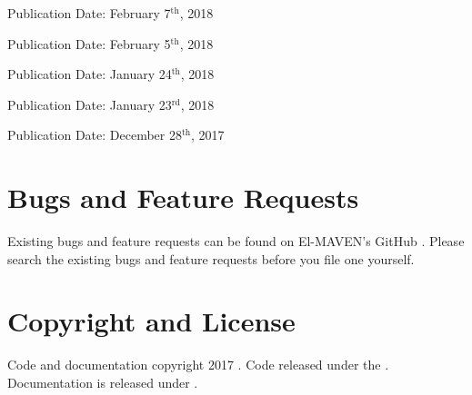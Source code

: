 \documentclass[letterpaper,10pt,english,openany,oneside]{sphinxmanual}
\begin{document}

Publication Date: February 7$^{\text{th}}$, 2018


Publication Date: February 5$^{\text{th}}$, 2018


Publication Date: January 24$^{\text{th}}$, 2018


Publication Date: January 23$^{\text{rd}}$, 2018


Publication Date: December 28$^{\text{th}}$, 2017


\section{Bugs and Feature Requests}
\label{\detokenize{BugsandFeatureRequests:bugs-and-feature-requests}}\label{\detokenize{BugsandFeatureRequests::doc}}
Existing bugs and feature requests can be found on El-MAVEN’s GitHub .
Please search the existing bugs and feature requests before you file one yourself.


\section{Copyright and License}
\label{\detokenize{CopyrightandLicense:copyright-and-license}}\label{\detokenize{CopyrightandLicense::doc}}
Code and documentation copyright 2017 . Code released under the . Documentation is released under .



\renewcommand{\indexname}{Index}
\printindex
\end{document}
